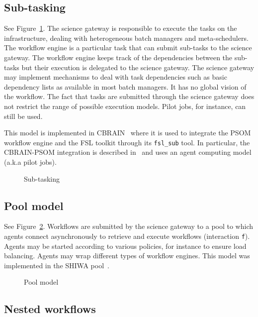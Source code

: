 \documentclass[preprint,3p,twocolumn]{elsarticle}
\begin{document}
\subsection{Sub-tasking}

See Figure~\ref{archi:sub-task}. The science gateway is responsible to
execute the tasks on the infrastructure, dealing with heterogeneous
batch managers and meta-schedulers. The workflow engine is a
particular task that can submit sub-tasks to the science gateway. The
workflow engine keeps track of the dependencies between the sub-tasks
but their execution is delegated to the science gateway. The science
gateway may implement mechanisms to deal with task dependencies such
as basic dependency lists as available in most batch managers. It has
no global vision of the workflow. The fact that tasks are submitted
through the science gateway does not restrict the range of possible
execution models. Pilot jobs, for instance, can still be used.

This model is implemented in CBRAIN~\cite{SHER-14} where it is used to
integrate the PSOM workflow engine and the FSL toolkit through its
\texttt{fsl\_sub} tool. In particular, the CBRAIN-PSOM integration is
described in~\cite{GLAT-16} and uses an agent computing model (a.k.a pilot
jobs).
\begin{figure}
\centering
\def\svgwidth{0.5\columnwidth}

\caption{Sub-tasking}
\label{archi:sub-task}
\end{figure}

\subsection{Pool model}

See Figure~\ref{archi:agent}. Workflows are submitted by the science
gateway to a pool to which agents connect asynchronously to retrieve
and execute workflows (interaction \texttt{f}). Agents may be started according to various
policies, for instance to ensure load balancing. Agents may wrap
different types of workflow engines. This model was implemented in the
SHIWA pool~\cite{ROGE-13}.
\begin{figure}
\centering
\def\svgwidth{0.8\columnwidth}

\caption{Pool model}
\label{archi:agent}
\end{figure}

\subsection{Nested workflows}
\end{document}
